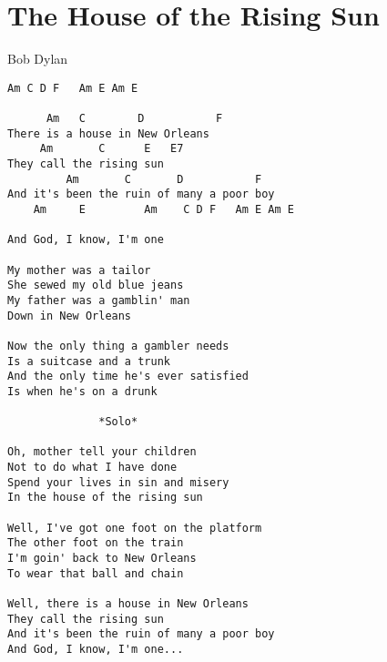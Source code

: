 \section{The House of the Rising Sun} \label{sec:song6}
Bob Dylan
\begin{verbatim}
Am C D F   Am E Am E 

      Am   C        D           F
There is a house in New Orleans
     Am       C      E   E7
They call the rising sun
         Am       C       D           F
And it's been the ruin of many a poor boy
    Am     E         Am    C D F   Am E Am E 

And God, I know, I'm one

My mother was a tailor
She sewed my old blue jeans
My father was a gamblin' man
Down in New Orleans

Now the only thing a gambler needs
Is a suitcase and a trunk
And the only time he's ever satisfied
Is when he's on a drunk

              *Solo*

Oh, mother tell your children
Not to do what I have done
Spend your lives in sin and misery
In the house of the rising sun

Well, I've got one foot on the platform
The other foot on the train
I'm goin' back to New Orleans
To wear that ball and chain

Well, there is a house in New Orleans
They call the rising sun
And it's been the ruin of many a poor boy
And God, I know, I'm one...
\end{verbatim}

